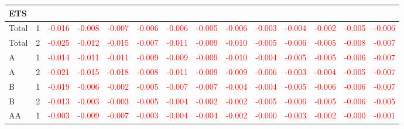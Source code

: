 \begin{table}[!htb]
{\begin{tabular}{llcccccccccccc}
\hline
ETS &  &  &  &  &  &  &  &  &  &  &  &  & \\
\hline
Total & 1 & \textcolor{red}{-0.016} & \textcolor{red}{-0.008} & \textcolor{red}{-0.007} & \textcolor{red}{-0.006} & \textcolor{red}{-0.006} & \textcolor{red}{-0.005} & \textcolor{red}{-0.006} & \textcolor{red}{-0.003} & \textcolor{red}{-0.004} & \textcolor{red}{-0.002} & \textcolor{red}{-0.005} & \textcolor{red}{-0.006}\\
Total & 2 & \textcolor{red}{-0.025} & \textcolor{red}{-0.012} & \textcolor{red}{-0.015} & \textcolor{red}{-0.007} & \textcolor{red}{-0.011} & \textcolor{red}{-0.009} & \textcolor{red}{-0.010} & \textcolor{red}{-0.005} & \textcolor{red}{-0.006} & \textcolor{red}{-0.005} & \textcolor{red}{-0.008} & \textcolor{red}{-0.007}\\
A & 1 & \textcolor{red}{-0.014} & \textcolor{red}{-0.011} & \textcolor{red}{-0.011} & \textcolor{red}{-0.009} & \textcolor{red}{-0.009} & \textcolor{red}{-0.009} & \textcolor{red}{-0.010} & \textcolor{red}{-0.004} & \textcolor{red}{-0.005} & \textcolor{red}{-0.005} & \textcolor{red}{-0.006} & \textcolor{red}{-0.007}\\
A & 2 & \textcolor{red}{-0.021} & \textcolor{red}{-0.015} & \textcolor{red}{-0.018} & \textcolor{red}{-0.008} & \textcolor{red}{-0.011} & \textcolor{red}{-0.009} & \textcolor{red}{-0.009} & \textcolor{red}{-0.006} & \textcolor{red}{-0.003} & \textcolor{red}{-0.004} & \textcolor{red}{-0.005} & \textcolor{red}{-0.007}\\
B & 1 & \textcolor{red}{-0.019} & \textcolor{red}{-0.006} & \textcolor{red}{-0.002} & \textcolor{red}{-0.005} & \textcolor{red}{-0.007} & \textcolor{red}{-0.007} & \textcolor{red}{-0.004} & \textcolor{red}{-0.004} & \textcolor{red}{-0.005} & \textcolor{red}{-0.006} & \textcolor{red}{-0.006} & \textcolor{red}{-0.007}\\
B & 2 & \textcolor{red}{-0.013} & \textcolor{red}{-0.003} & \textcolor{red}{-0.003} & \textcolor{red}{-0.005} & \textcolor{red}{-0.004} & \textcolor{red}{-0.002} & \textcolor{red}{-0.002} & \textcolor{red}{-0.005} & \textcolor{red}{-0.006} & \textcolor{red}{-0.005} & \textcolor{red}{-0.006} & \textcolor{red}{-0.005}\\
AA & 1 & \textcolor{red}{-0.003} & \textcolor{red}{-0.009} & \textcolor{red}{-0.007} & \textcolor{red}{-0.003} & \textcolor{red}{-0.004} & \textcolor{red}{-0.004} & \textcolor{red}{-0.002} & \textcolor{red}{-0.000} & \textcolor{red}{-0.003} & \textcolor{red}{-0.002} & \textcolor{red}{-0.000} & \textcolor{red}{-0.001}\\

\end{tabular}}
\end{table}
